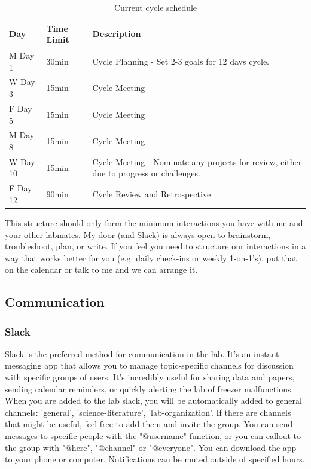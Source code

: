 \documentclass[10pt, a4paper, twocolumn]{article} %
\begin{document}
\begin{table}
	\caption{Current cycle schedule}
	\centering
	\begin{tabular}{lll}
		\toprule
		\cmidrule(r){1-2}
		Day & Time Limit & Description \\
		\midrule
		M Day 1 & 30min & Cycle Planning - Set 2-3 goals for 12 days cycle. \\
		W Day 3 & 15min & Cycle Meeting  \\
		F Day 5 & 15min & Cycle Meeting \\
		M Day 8 & 15min & Cycle Meeting \\
		W Day 10 & 15min & Cycle Meeting - Nominate any projects for review, either due to progress or challenges.  \\
		F Day 12 & 90min & Cycle Review and Retrospective \\
		\bottomrule
	\end{tabular}
\end{table}

This structure should only form the minimum interactions you have with me and your other labmates. My door (and Slack) is always open to brainstorm, troubleshoot, plan, or write. If you feel you need to structure our interactions in a way that works better for you (e.g. daily check-ins or weekly 1-on-1's), put that on the calendar or talk to me and we can arrange it.

\subsection{Communication}

\subsubsection{Slack}
Slack is the preferred method for communication in the lab. It's an instant messaging app that allows you to manage topic-specific channels for discussion with specific groups of users. It’s incredibly useful for sharing data and papers, sending calendar reminders, or quickly alerting the lab of freezer malfunctions. When you are added to the lab slack, you will be automatically added to general channels: 'general', 'science-literature', 'lab-organization'. If there are channels that might be useful, feel free to add them and invite the group. You can send messages to specific people with the "@username" function, or you can callout to the group with "@here", "@channel" or "@everyone". You can download the app to your phone or computer. Notifications can be muted outside of specified hours.
\end{document}
